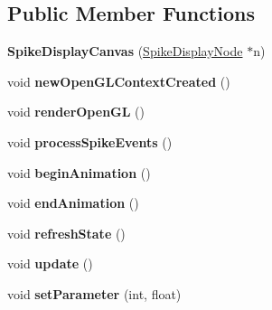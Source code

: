\subsection*{Public Member Functions}
\begin{DoxyCompactItemize}
\item 
\hypertarget{classSpikeDisplayCanvas_a0888c7007d81938ddf9ddf1fa2ae893e}{{\bfseries Spike\-Display\-Canvas} (\hyperlink{classSpikeDisplayNode}{Spike\-Display\-Node} $\ast$n)}\label{classSpikeDisplayCanvas_a0888c7007d81938ddf9ddf1fa2ae893e}

\item 
\hypertarget{classSpikeDisplayCanvas_a7eed711e3f4071c92647f5254e654e85}{void {\bfseries new\-Open\-G\-L\-Context\-Created} ()}\label{classSpikeDisplayCanvas_a7eed711e3f4071c92647f5254e654e85}

\item 
\hypertarget{classSpikeDisplayCanvas_aca84f3bb9147da2d8cddb30f444d9d92}{void {\bfseries render\-Open\-G\-L} ()}\label{classSpikeDisplayCanvas_aca84f3bb9147da2d8cddb30f444d9d92}

\item 
\hypertarget{classSpikeDisplayCanvas_aafd6720a9b69f84eb6d24dda68f47f93}{void {\bfseries process\-Spike\-Events} ()}\label{classSpikeDisplayCanvas_aafd6720a9b69f84eb6d24dda68f47f93}

\item 
\hypertarget{classSpikeDisplayCanvas_a26858b90d2bc57ca8b92b647308b094b}{void {\bfseries begin\-Animation} ()}\label{classSpikeDisplayCanvas_a26858b90d2bc57ca8b92b647308b094b}

\item 
\hypertarget{classSpikeDisplayCanvas_a41c67fb1fe854bfc911c5377957c0bb3}{void {\bfseries end\-Animation} ()}\label{classSpikeDisplayCanvas_a41c67fb1fe854bfc911c5377957c0bb3}

\item 
\hypertarget{classSpikeDisplayCanvas_ae5b0fc9d70c41fbd19b7f8daa92e0d49}{void {\bfseries refresh\-State} ()}\label{classSpikeDisplayCanvas_ae5b0fc9d70c41fbd19b7f8daa92e0d49}

\item 
\hypertarget{classSpikeDisplayCanvas_a55358b1cffea350a07f9f9f407f24324}{void {\bfseries update} ()}\label{classSpikeDisplayCanvas_a55358b1cffea350a07f9f9f407f24324}

\item 
\hypertarget{classSpikeDisplayCanvas_a9dd02a54f501470d846563bdf4750879}{void {\bfseries set\-Parameter} (int, float)}\label{classSpikeDisplayCanvas_a9dd02a54f501470d846563bdf4750879}


\end{DoxyCompactItemize}
